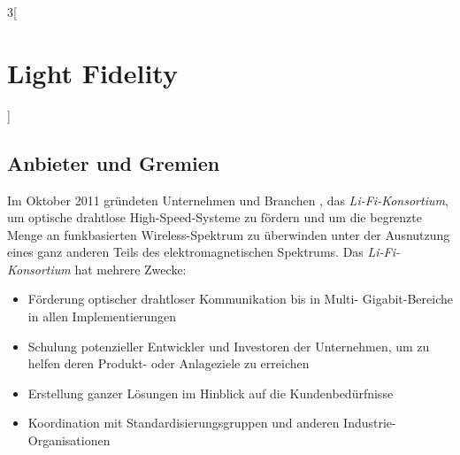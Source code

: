 \begin{multicols}{3}[\section{Light Fidelity}]
\subsection*{Anbieter und Gremien}


Im Oktober 2011 gründeten Unternehmen und Branchen , das \textit{Li-Fi-Konsortium}, um optische drahtlose High-Speed-Systeme zu fördern und um die begrenzte Menge an funkbasierten Wireless-Spektrum zu überwinden unter der Ausnutzung eines ganz anderen Teils des elektromagnetischen Spektrums.
Das \textit{Li-Fi-Konsortium} hat mehrere Zwecke:
\begin{itemize}
\item Förderung optischer drahtloser Kommunikation bis in Multi- Gigabit-Bereiche in allen Implementierungen
\item Schulung potenzieller Entwickler und Investoren der Unternehmen, um zu helfen deren Produkt- oder Anlageziele zu erreichen
\item Erstellung ganzer Lösungen im Hinblick auf die Kundenbedürfnisse
\item Koordination mit Standardisierungsgruppen und anderen Industrie-Organisationen
\end{itemize}

\end{multicols}
